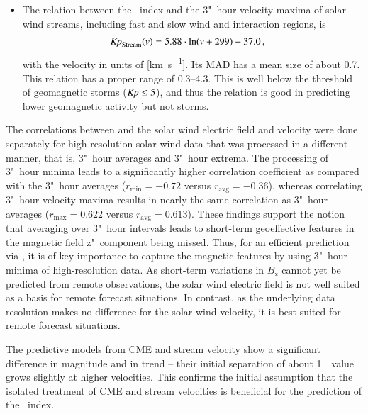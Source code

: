 \begin{itemize}
	\pagebreak

	\item The relation between the \Kp~index and the 3"~hour velocity maxima of solar wind streams, including fast and slow wind and interaction regions, is
	\begin{align*}
		\text{\Kp}_\text{Stream}(v) &= 5.88 \cdot \ln(v + 299) - 37.0	\,,
	\end{align*}
	with the velocity in units of [\si{\km\per\s}]. Its MAD has a mean \Kp{} size of about \num{0.7}. This relation has a proper \Kp{} range of \numrange{0.3}{4.3}. This is well below the threshold of geomagnetic storms ($\si{\Kp} \leq 5$), and thus the relation is good in predicting lower geomagnetic activity but not storms.
\end{itemize}

\medskip

The correlations between \Kp{} and the solar wind electric field and velocity were done separately for high-resolution solar wind data that was processed in a different manner, that is, 3"~hour averages and 3"~hour extrema. The processing of 3"~hour \vBz{} minima leads to a significantly higher correlation coefficient as compared with the 3"~hour averages ($r_\text{min} = -0.72$ versus $r_\text{avg} = -0.36$), whereas correlating 3"~hour velocity maxima results in nearly the same correlation as 3"~hour averages ($r_\text{max} = 0.622$ versus $r_\text{avg} = 0.613$).
These findings support the notion that averaging over 3"~hour intervals leads to short-term geoeffective features in the magnetic field z"~component being missed. Thus, for an efficient \Kp{} prediction via \vBz{}, it is of key importance to capture the magnetic features by using 3"~hour minima of high-resolution data. As short-term variations in $B_\text{z}$ cannot yet be predicted from remote observations, the solar wind electric field is not well suited as a basis for remote forecast situations.
In contrast, as the underlying data resolution makes no difference for the solar wind velocity, it is best suited for remote forecast situations.

The \Kp{} predictive models from CME and stream velocity show a significant difference in magnitude and in trend -- their initial separation of about 1~\Kp~value grows slightly at higher velocities. This confirms the initial assumption that the isolated treatment of CME and stream velocities is beneficial for the prediction of the \Kp~index.

